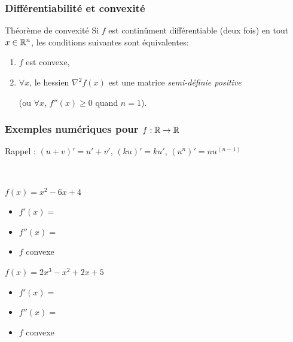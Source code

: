 \begin{frame}
  \frametitle{Différentiabilité et convexité}

  \begin{block}{Théorème de convexité}
    Si $f$ est continûment différentiable (deux fois) en tout $x \in {\ensuremath\mathbb{R}}^n$,
    les conditions suivantes sont équivalentes:
    \begin{enumerate}
    \item $f$ est convexe,
    \item $\forall x$, le hessien $\nabla^2f(x)$ est une matrice \emph{semi-définie positive}

      (ou $\forall x$, $f''(x) \geq 0$ quand $n = 1$).
    \end{enumerate}
  \end{block}

\end{frame}

\begin{frame}
  \frametitle{Exemples numériques pour $f:{\mathbb{R}} \rightarrow {\ensuremath\mathbb{R}}$}

  Rappel : $(u+v)' = u'+v'$, $(ku)' = ku'$, $(u^n)' = nu^{(n-1)}$

  ~
  
  \begin{block}{$f(x) = x^2 - 6x + 4$}
    \begin{itemize}
      \item $f'(x) =$\only<1>{?}
      \item $f''(x) =$ 
      \item $f$ convexe 
    \end{itemize}
  \end{block}

  \begin{block}{$f(x) = 2x^3 - x^2 + 2x + 5$}
    \begin{itemize}
      \item $f'(x) =$\only<1>{?}
      \item $f''(x) = $
      \item $f$ convexe 
    \end{itemize}
  \end{block}
  
\end{frame}

